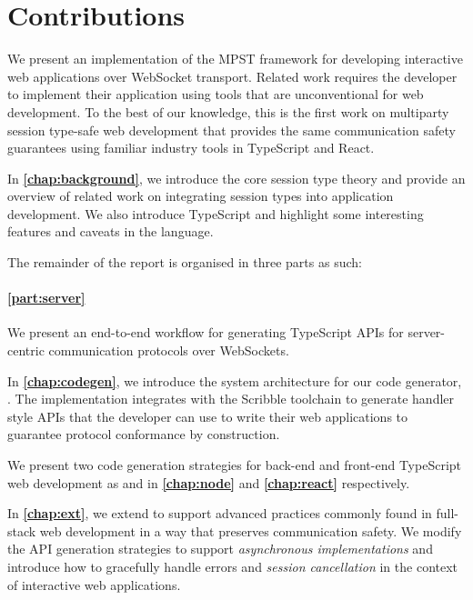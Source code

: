 \section{Contributions}

We present an implementation of the MPST framework for developing
interactive web applications over WebSocket transport. 
Related work \citep{PureScript2019, MVU2020, LINKS, Exceptional} requires the 
developer to implement their application using tools that are 
unconventional for web development.
To the best of our knowledge, this is the first work on multiparty session
type-safe web development that provides the same communication safety 
guarantees using familiar industry tools in TypeScript and React.

In \textbf{\cref{chap:background}}, 
we introduce the core session type theory
and provide an overview of related work on integrating session types into
application development. We also introduce TypeScript and highlight some 
interesting features and caveats in the language.

The remainder of the report is organised in three parts as such:

\paragraph{\cref{part:server}}
We present an end-to-end workflow for generating TypeScript APIs for 
server-centric communication protocols over WebSockets. 

In \textbf{\cref{chap:codegen}}, 
we introduce the system architecture for our
code generator, . 
The implementation integrates with the Scribble
toolchain to generate handler style APIs that the developer can use to write 
their web applications to guarantee protocol conformance by construction.

We present two code generation strategies for back-end and front-end
TypeScript web development as  and 
in \textbf{\cref{chap:node}} and \textbf{\cref{chap:react}} respectively.

In \textbf{\cref{chap:ext}},
we extend  to support advanced
practices commonly found in full-stack web development in a way that
preserves communication safety. We modify the API generation strategies
to support \textit{asynchronous implementations} 
and introduce how to 
gracefully handle errors and \textit{session cancellation} 
in the context of interactive web applications.

